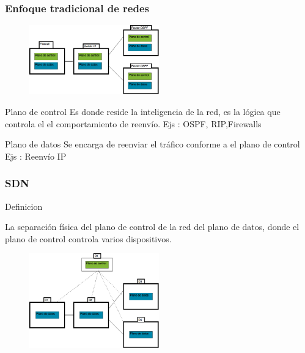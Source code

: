 \documentclass{beamer}
\begin{document}
\begin{frame}
\frametitle{Enfoque tradicional de redes} 



	\begin{figure}[H]
		\raggedright
		\includegraphics[width=0.5\textwidth, center]{imagenes/SDN-tradicional.png}
	\end{figure}

\hfill


\begin{block}{Plano de control}
Es donde reside la inteligencia de la red, es la l\'ogica que controla el el comportamiento de reenv\'io. Ejs : OSPF, RIP,Firewalls
\end{block}



\begin{block}{Plano de datos}
Se encarga de reenviar el tr\'afico conforme a el plano de control Ejs : Reenv\'io IP
 
\end{block}


\end{frame}


\begin{frame}
\frametitle{SDN} 

\begin{block}{Definicion}

La separación física del plano de control de la red del plano de datos, donde el plano
de control controla varios dispositivos.

\end{block}

	\begin{figure}[H]
		\raggedright
		\includegraphics[width=0.5\textwidth, center]{imagenes/SDN-distribuido.png}
	\end{figure}

\end{frame}
\end{document}
